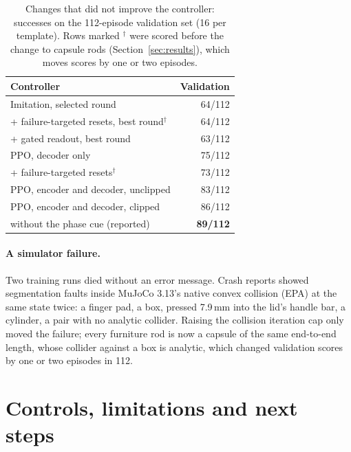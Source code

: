 \documentclass[10pt,twocolumn]{article}
\begin{document}
\begin{table}[t]
\centering
\small
\caption{Changes that did not improve the controller: successes on the 112-episode validation set (16 per template). Rows marked $^\dagger$ were scored before the change to capsule rods (Section~\ref{sec:results}), which moves scores by one or two episodes.}
\label{tab:negative}
\begin{tabular}{@{}lr@{}}
\toprule
Controller & Validation \\
\midrule
Imitation, selected round & 64/112 \\
\quad + failure-targeted resets, best round$^\dagger$ & 64/112 \\
\quad + gated readout, best round & 63/112 \\
PPO, decoder only & 75/112 \\
\quad + failure-targeted resets$^\dagger$ & 73/112 \\
PPO, encoder and decoder, unclipped & 83/112 \\
PPO, encoder and decoder, clipped & 86/112 \\
\quad without the phase cue (reported) & \textbf{89/112} \\
\bottomrule
\end{tabular}
\end{table}

\paragraph{A simulator failure.}
Two training runs died without an error message.
Crash reports showed segmentation faults inside MuJoCo 3.13's native convex collision (EPA) at the same state twice: a finger pad, a box, pressed 7.9\,mm into the lid's handle bar, a cylinder, a pair with no analytic collider.
Raising the collision iteration cap only moved the failure; every furniture rod is now a capsule of the same end-to-end length, whose collider against a box is analytic, which changed validation scores by one or two episodes in 112.

\section{Controls, limitations and next steps}
\label{sec:limits}
\end{document}
